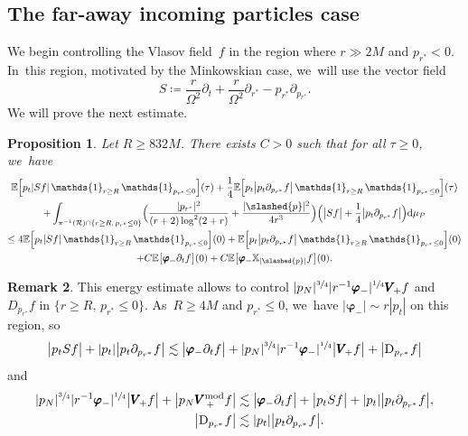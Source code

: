 \documentclass[JEP,XML,SOM,Unicode,published]{cedram}
\theoremstyle{plain}
\newtheorem{proposition}{Proposition}[section]
\theoremstyle{definition}
\newtheorem{remark}[proposition]{Remark}
\newcommand\T{{\mathbb{X}}}
\newcommand\dr{{\mathrm{d}}}
\begin{document}
\subsection{The far-away incoming particles case}\label{Subsec72}

We begin controlling the Vlasov field~$f$ in the region where $r \gg 2M$ and $p_{r^*} <0$. In~this region, motivated by the Minkowskian case, we~will use the vector field
\[
S \coloneqq \frac{r}{\Omega^2}\partial_t+\frac{r}{\Omega^2}\partial_{r^*}-p_{r^*} \partial_{p_{r^*}}.
\]
We will prove the next estimate.

\begin{proposition}\label{Proestiincoming}
Let $R \geq 832M$. There exists $C >0$ such that for all $\tau \geq 0$, we~have
\begin{multline*}
\mathbb{E} \Bigl[ p_t |Sf| \, \mathds{1}_{r \geq R} \, \mathds{1}_{p_{r^*} \leq 0} \Bigr](\tau)+\frac{1}{4}\mathbb{E} \Bigl[ p_t \big|p_t \partial_{p_{r^*}} f \big| \, \mathds{1}_{r \geq R} \, \mathds{1}_{p_{r^*} \leq 0} \Bigr](\tau) \\
+ \int_{\pi^{-1}(\mathcal{R}) \cap \{ r\geq R, \, p_{r^*} \leq 0 \} } \Bigl(\frac{|p_{r^*}|^2}{(r+2)\log^2(2+r)}+\frac{|\slashed{p}|^2}{4r^3} \Bigr) \Bigl(\big|S f \big| + \frac{1}{4} \big|p_t \partial_{p_{r^*}} f \big| \Bigr) \dr \mu_{\mathcal{P}} \\
\leq 4\mathbb{E} \Bigl[ p_t |Sf| \, \mathds{1}_{r \geq R} \, \mathds{1}_{p_{r^*} \leq 0} \Bigr](0)+\mathbb{E} \Bigl[ p_t \big| p_t \partial_{p_{r^*}} f \big| \, \mathds{1}_{r \geq R} \, \mathds{1}_{p_{r^*} \leq 0} \Bigr](0) \\
+C\mathbb{E} \bigl[ \pmb{\varphi}_- \partial_t f \bigr](0)+ C\mathbb{E} \bigl[ \pmb{\varphi}_- \T_{|\slashed{p}|} f \bigr](0).
\end{multline*}
\end{proposition}
\begin{remark}\label{RkProestiincoming}
This energy estimate allows to control $|p_N|^{\sfrac{3}{4}} |r^{-1} \pmb{\varphi}_-|^{\sfrac{1}{4}} \pmb{V}_{\! +} f$ and $D_{p_{r^*}} f$ in $\{ r \geq R, \, p_{r^*} \leq 0 \}$. As~$R \geq 4M$ and $p_{r^*} \leq 0$, we~have $|\pmb{\varphi}_-| \sim r|p_t|$ on this region, so
\[
\big| p_t S f \big|+ |p_t|\big| p_t \partial_{p_{r^*}} f \big| \lesssim \big| \pmb{ \varphi}_- \partial_t f \big|+ |p_N|^{\sfrac{3}{4}} |r^{-1} \pmb{\varphi}_-|^{\sfrac{1}{4}} \big| \pmb{V}_{\! +} f \big|+\big| \mathrm{D}_{p_{r^*}} f \big|
\]
and
\begin{align*}
|p_N|^{\sfrac{3}{4}} |r^{-1} \pmb{\varphi}_-|^{\sfrac{1}{4}} \big| \pmb{V}_{\! +} f \big|+ \big| p_N \pmb{V}_{\, +}^{ \mathrm{mod}} f \big| & \lesssim \big| \pmb{\varphi}_- \partial_t f \big|+ \big| p_t S f \big|+ |p_t|\big| p_t \partial_{p_{r^*}} f \big|, \\
\big| \mathrm{D}_{p_{r^*}} f \big| & \lesssim |p_t|\big| p_t \partial_{p_{r^*}} f \big|.
\end{align*}
\end{remark}
\end{document}
